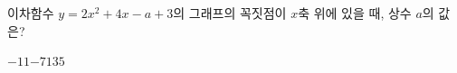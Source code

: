이차함수 $y=2x^2+4x-a+3$의 그래프의 꼭짓점이 $x$축 위에 있을 때, 상수 $a$의 값은?
\begin{choices32}{$-11$}{$-7$}{$1$}{$3$}{$5$}\end{choices32}
